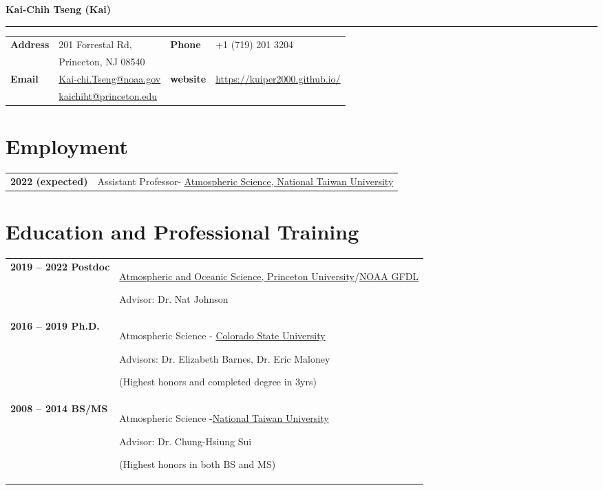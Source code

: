 \documentclass{article}
\begin{document}
{\huge\color{airforceblue}\textbf{Kai-Chih Tseng (Kai)}\par}
\rule{\textwidth}{0.5mm}\par

\vspace{5ex}

\begin{tabular}{
		>{\bfseries}p{.20\linewidth}
		p{.4\linewidth}
		>{\bfseries}p{.1\linewidth}
		p{.25\linewidth}
	}
	Address       & 201 Forrestal Rd,          &  Phone  & +1 (719) 201 3204 \\
	              & Princeton, NJ 08540          &    &  \\
	Email         & \href{mailto:Kai-chi.Tseng@noaa.gov}{Kai-chi.Tseng@noaa.gov} & website & \href{https://kuiper2000.github.io/}{https://kuiper2000.github.io/}    \\
                  & \href{mailto:kaichiht@princeton.edu}{kaichiht@princeton.edu} &       &     \\
\end{tabular}

\section{\color{airforceblue}Employment}
\begin{tabular}{>{\bfseries}p{4cm}p{\linewidth-2.5cm\relax}}
	2022 (expected)   & Assistant Professor- \href{https://www.princeton.edu/}{Atmospheric Science, National Taiwan University}\par
\end{tabular}


\section{\color{airforceblue}Education and Professional Training}
\begin{tabular}{>{\bfseries}p{4cm}p{\linewidth-2.5cm\relax}}
	2019  -- 2022 Postdoc & \href{https://www.princeton.edu/}{Atmospheric and Oceanic Science, Princeton University}/\href{https://www.gfdl.noaa.gov/}{NOAA GFDL}\par
	Advisor: Dr. Nat Johnson \par
	
    \\
	2016 -- 2019 Ph.D. & Atmospheric Science -
	\href{https://www.colostate.edu/}{Colorado State University}\par
	Advisors: Dr. Elizabeth Barnes, Dr. Eric Maloney \par
	(Highest honors and completed degree in 3yrs)\par
	\\
	2008 -- 2014 BS/MS & Atmospheric Science -\href{https://www.ntu.edu.tw/}{National Taiwan University}\par
	Advisor: Dr. Chung-Hsiung Sui \par
	(Highest honors in both BS and MS) \par
	

\end{tabular}
\end{document}
